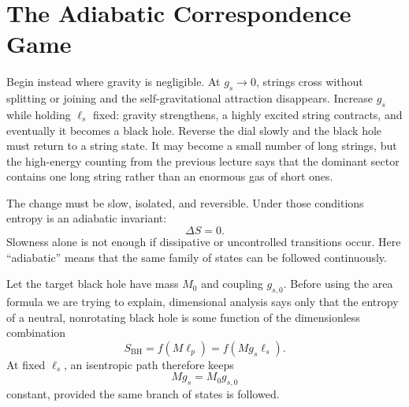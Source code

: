 \begin{classroomqa}
\end{classroomqa}

\section{The Adiabatic Correspondence Game}

Begin instead where gravity is negligible. At \(g_s\to0\), strings cross without splitting or joining and the self-gravitational attraction disappears. Increase \(g_s\) while holding \(\ell_s\) fixed: gravity strengthens, a highly excited string contracts, and eventually it becomes a black hole. Reverse the dial slowly and the black hole must return to a string state. It may become a small number of long strings, but the high-energy counting from the previous lecture says that the dominant sector contains one long string rather than an enormous gas of short ones.

\begin{classroomqa}
\end{classroomqa}

The change must be slow, isolated, and reversible. Under those conditions entropy is an adiabatic invariant:
\begin{equation}
\Delta S=0.
\label{eq:l07-adiabatic}
\end{equation}
Slowness alone is not enough if dissipative or uncontrolled transitions occur. Here ``adiabatic'' means that the same family of states can be followed continuously.

Let the target black hole have mass \(M_0\) and coupling \(g_{s,0}\). Before using the area formula we are trying to explain, dimensional analysis says only that the entropy of a neutral, nonrotating black hole is some function of the dimensionless combination
\begin{equation}
S_{\mathrm{BH}}=f(M\ell_p)
=f(Mg_s\ell_s).
\label{eq:l07-entropy-function}
\end{equation}
At fixed \(\ell_s\), an isentropic path therefore keeps
\begin{equation}
Mg_s=M_0g_{s,0}
\label{eq:l07-adiabat}
\end{equation}
constant, provided the same branch of states is followed.

